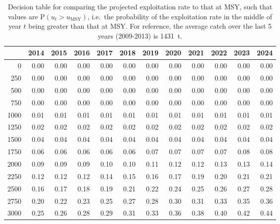 \documentclass[11pt]{book}
\begin{document}
\begin{table}[!ht]
\centering
\caption{Decision table for comparing the projected exploitation rate to that at MSY, such that values are P$(u_t > u_\mathrm{MSY})$, i.e.~the probability of the exploitation rate in the middle of year $t$ being greater than that at MSY. For reference, the average catch over the last 5 years (2009-2013) is 1431~t.} 
\label{tab:umsy}
\begin{tabular}{rrrrrrrrrrrr}
  \\[-1.0ex] \hline
 & 2014 & 2015 & 2016 & 2017 & 2018 & 2019 & 2020 & 2021 & 2022 & 2023 & 2024 \\ 
  \hline
0 & 0.00 & 0.00 & 0.00 & 0.00 & 0.00 & 0.00 & 0.00 & 0.00 & 0.00 & 0.00 & 0.00 \\ 
  250 & 0.00 & 0.00 & 0.00 & 0.00 & 0.00 & 0.00 & 0.00 & 0.00 & 0.00 & 0.00 & 0.00 \\ 
  500 & 0.00 & 0.00 & 0.00 & 0.00 & 0.00 & 0.00 & 0.00 & 0.00 & 0.00 & 0.00 & 0.00 \\ 
  750 & 0.00 & 0.00 & 0.00 & 0.00 & 0.00 & 0.00 & 0.00 & 0.00 & 0.00 & 0.00 & 0.00 \\ 
  1000 & 0.01 & 0.01 & 0.01 & 0.01 & 0.01 & 0.01 & 0.01 & 0.01 & 0.01 & 0.01 & 0.01 \\ 
  1250 & 0.02 & 0.02 & 0.02 & 0.02 & 0.02 & 0.02 & 0.02 & 0.02 & 0.02 & 0.02 & 0.02 \\ 
  1500 & 0.04 & 0.04 & 0.04 & 0.04 & 0.04 & 0.04 & 0.04 & 0.04 & 0.04 & 0.04 & 0.04 \\ 
  1750 & 0.06 & 0.06 & 0.06 & 0.06 & 0.06 & 0.07 & 0.07 & 0.07 & 0.07 & 0.08 & 0.08 \\ 
  2000 & 0.09 & 0.09 & 0.09 & 0.10 & 0.10 & 0.11 & 0.12 & 0.12 & 0.13 & 0.13 & 0.14 \\ 
  2250 & 0.12 & 0.12 & 0.12 & 0.14 & 0.15 & 0.16 & 0.17 & 0.19 & 0.20 & 0.21 & 0.21 \\ 
  2500 & 0.16 & 0.17 & 0.18 & 0.19 & 0.21 & 0.22 & 0.24 & 0.25 & 0.26 & 0.27 & 0.28 \\ 
  2750 & 0.20 & 0.22 & 0.23 & 0.25 & 0.27 & 0.28 & 0.30 & 0.31 & 0.33 & 0.35 & 0.36 \\ 
  3000 & 0.25 & 0.26 & 0.28 & 0.29 & 0.31 & 0.33 & 0.36 & 0.38 & 0.40 & 0.42 & 0.44 \\ 
   \hline
\end{tabular}
\end{table}
 \clearpage \pagebreak %
\end{document}
